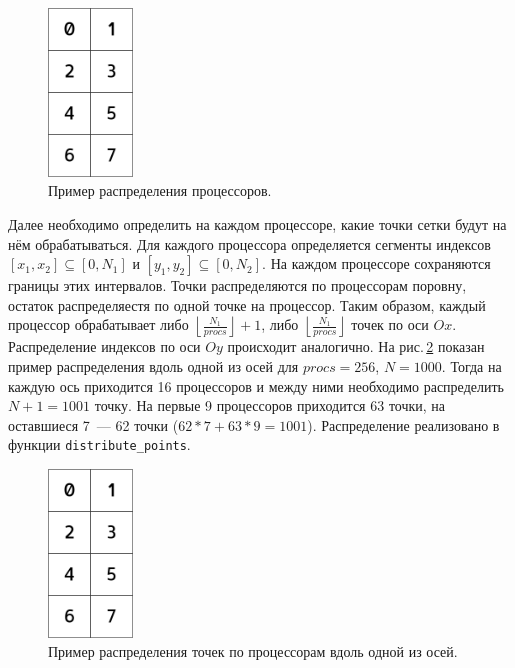 \documentclass[11pt]{article}
\numberwithin{equation}{section}
\theoremstyle{plain}
\theoremstyle{definition}
\begin{document}
\begin{figure}[ht]
    \centering
    \includegraphics[width=0.2\textwidth]{proc_distr.png}
    \caption{Пример распределения процессоров.}
    \label{distr_procs}
\end{figure}

Далее необходимо определить на каждом процессоре, какие точки сетки будут на
нём обрабатываться. Для каждого процессора определяется сегменты индексов
$[x_1, x_2] \subseteq [0, N_1]$ и $[y_1, y_2] \subseteq [0, N_2]$.
На каждом процессоре сохраняются границы этих интервалов.
Точки распределяются по процессорам поровну, остаток распределяестя по
одной точке на процессор. Таким образом, каждый процессор
обрабатывает
либо $\left \lfloor \frac{N_1}{procs} \right \rfloor + 1$, либо
$\left \lfloor \frac{N_1}{procs} \right \rfloor$ точек по оси $Ox$.
Распределение индексов по оси $Oy$ происходит аналогично.
На рис.\,\ref{distr_points} показан пример распределения вдоль одной из
осей для $procs = 256$, $N = 1000$. Тогда на каждую ось приходится 16 процессоров
и между ними необходимо распределить $N + 1 = 1001$ точку. На первые 9
процессоров приходится 63 точки, на оставшиеся 7~--- 62 точки ($62*7 + 63*9 = 1001$).
Распределение реализовано в функции \verb|distribute_points|.

\begin{figure}[ht]
    \centering
    \includegraphics[width=0.2\textwidth]{proc_distr.png}
    \caption{Пример распределения точек по процессорам вдоль одной из осей.}
    \label{distr_points}
\end{figure}
\end{document}
